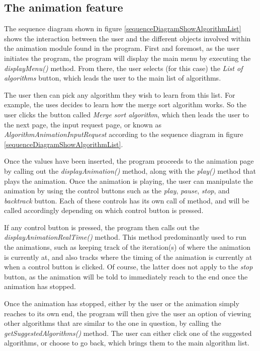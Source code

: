 

\subsection{The animation feature}
The sequence diagram shown in figure \ref{sequenceDiagramShowAlgorithmList} shows the interaction between the user and the different objects involved within the animation module found in the program. First and foremost, as the user initiates the program, the program will display the main menu by executing the \textit{displayMenu()} method. From there, the user selects (for this case) the \textit{List of algorithms} button, which leads the user to the main list of algorithms.

The user then can pick any algorithm they wish to learn from this list. For example, the uses decides to learn how the merge sort algorithm works. So the user clicks the button called \textit{Merge sort algorithm}, which then leads the user to the next page, the input request page, or known as \textit{AlgorithmAnimationInputRequest} according to the sequence diagram in figure \ref{sequenceDiagramShowAlgorithmList}.

Once the values have been inserted, the program proceeds to the animation page by calling out the \textit{displayAnimation()} method, along with the \textit{play()} method that plays the animation. Once the animation is playing, the user can manipulate the animation by using the control buttons such as the \textit{play}, \textit{pause}, \textit{stop}, and \textit{backtrack} button. Each of these controls has its own call of method, and will be called accordingly depending on which control button is pressed. 

If any control button is pressed, the program then calls out the \textit{displayAnimationRealTime()} method. This method predominantly used to run the animations, such as keeping track of the iteration(s) of where the animation is currently at, and also tracks where the timing of the animation is currently at when a control button is clicked. Of course, the latter does not apply to the \textit{stop} button, as the animation will be told to immediately reach to the end once the animation has stopped. 

Once the animation has stopped, either by the user or the animation simply reaches to its own end, the program will then give the user an option of viewing other algorithms that are similar to the one in question, by calling the \textit{getSuggestedAlgorithms()} method. The user can either click one of the suggested algorithms, or choose to go back, which brings them to the main algorithm list.

